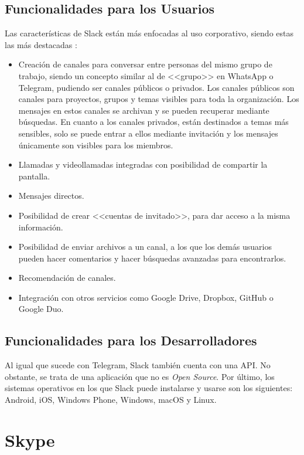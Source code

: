 \subsection{Funcionalidades para los Usuarios}
Las características de Slack están más enfocadas al uso corporativo, siendo estas las más destacadas \cite{Slack2017}:

\begin{itemize}
	\item Creación de canales para conversar entre personas del mismo grupo de trabajo, siendo un concepto similar al de <<grupo>> en WhatsApp o Telegram, pudiendo ser canales públicos o privados. Los canales públicos son canales para proyectos, grupos y temas visibles para toda la organización. Los mensajes en estos canales se archivan y se pueden recuperar mediante búsquedas. En cuanto a los canales privados, están destinados a temas más sensibles, solo se puede entrar a ellos mediante invitación y los mensajes únicamente son visibles para los miembros.

	\item Llamadas y videollamadas integradas con posibilidad de compartir la pantalla.
	\item Mensajes directos.
	\item Posibilidad de crear <<cuentas de invitado>>, para dar acceso a la misma información.
	\item Posibilidad de enviar archivos a un canal, a los que los demás usuarios pueden hacer comentarios y hacer búsquedas avanzadas para encontrarlos.
	\item Recomendación de canales.
	\item Integración con otros servicios como Google Drive, Dropbox, GitHub o Google Duo.
\end{itemize}

\subsection{Funcionalidades para los Desarrolladores}
Al igual que sucede con Telegram, Slack también cuenta con una \acs{API}. No obstante, se trata de una aplicación que no es \textit{Open Source}. Por último, los sistemas operativos en los que Slack puede instalarse y usarse son los siguientes: Android, iOS, Windows Phone, Windows, macOS y Linux.

\newpage

\section{Skype}
\label{sec:skype}

